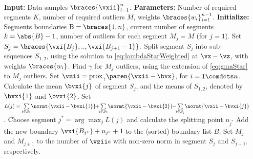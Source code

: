 \begin{algorithm}[!t]
\footnotesize
 \caption{Top-down outlier-robust hierarchical segmentation}\label{alg:topdownORCS}
  \begin{algorithmic}
    \STATE \textbf{Input:} Data samples $\braces{\vxii}_{i=1}^n$.
    \STATE \textbf{Parameters:} Number of required segments $K$, number of required outliers $M$, weights $\braces{w_i}_{i=1}^{n-1}$.
    \STATE \textbf{Initialize:} Segments boundaries $\mathrm{B}=\braces{1,n}$, current number of segments $k=\abs{B}-1$, number of outliers for each segment $M_j=M$ (for $j=1$).
            \STATE  Set $S_j=\braces{\vxi{B_j},..,\vxi{B_{j+1}-1}}$.
                \STATE Split segment $S_j$ into sub-sequences $S_{1,2}$, using the solution to
                \eqref{eq:lambdaStarWeighted} at $\vx-\vz$, with weights $\braces{w_i}$.
                \STATE Find $\gamma$ for $M_j$ outliers, using the extension of \eqref{eq:gmaStar} to $M_j$ outliers.
                \STATE Set $\vzii=\mathrm{prox}_{\gamma}\paren{\vxii-\bvx}$, for $i=1\comdots n$.
            \ENDWHILE
            \STATE Calculate the mean $\bvxi{j}$ of segment $S_j$, and the means of $S_{1,2}$, denoted by $\bvxi{1}$ and $\bvxi{2}$.
            \STATE Set \(L(j)=%
              \sum \limits_{i\in S_1}\!\normt{\vxii-\bvxi{1}}
              \!\!+\!\!
              \sum\limits_{i\in S_2}\!\normt{\vxii-\bvxi{2}}
              \!\!-\!\!
              \sum \limits_{i\in S_j}\!\normt{\vxii-\bvxi{j}}\).
        \ENDFOR
        \STATE Choose segment $j^* = \arg\max_j  L(j)$ and calculate the splitting
        point $n_{j^*}$
        \STATE Add the new boundary $\vxi{B_{j^*}} + n_{j^*} + 1$ to the (sorted) boundary list $B$.
        \STATE Set $M_j$ and $M_{j+1}$ to the number of $\vzii$s with non-zero norm in segment $S_j$ and $S_{j+1}$, respectively.
    \ENDWHILE
\end{algorithmic}
\end{algorithm}

